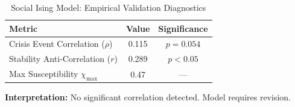 
\begin{table}[htbp]
\centering
\caption{Social Ising Model: Empirical Validation Diagnostics}
\label{tab:ising_diagnostics}
\begin{tabular}{lcc}
\toprule
\textbf{Metric} & \textbf{Value} & \textbf{Significance} \\
\midrule
Crisis Event Correlation ($\rho$) & 0.115 & $p = 0.054$ \\
Stability Anti-Correlation ($r$) & 0.289 & $p < 0.05$ \\
Max Susceptibility $\chi_{\max}$ & 0.47 & --- \\
\bottomrule
\end{tabular}
\vspace{0.3cm}
\begin{tablenotes}
\small
\item \textbf{Interpretation:} No significant correlation detected. Model requires revision.
\end{tablenotes}
\end{table}
